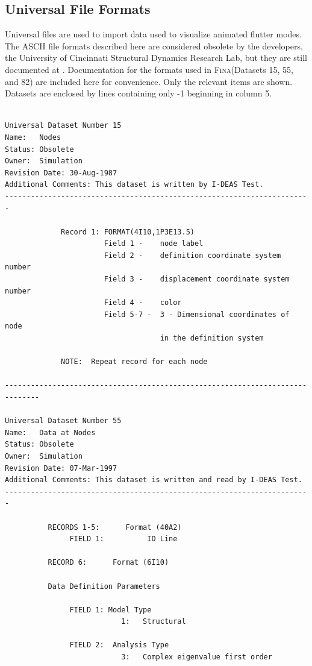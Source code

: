 \documentclass[10pt,openany,twoside]{book}
\numberwithin{equation}{section}   %
\newcommand{\Fina}{{\normalfont\scshape Fina\:}}
\begin{document}
\subsection{Universal File Formats}\label{sect:universal-file}
Universal files are used to import data used to visualize animated
flutter modes.
The ASCII file formats described here are considered obsolete by the
developers, the University of Cincinnati Structural Dynamics Research Lab,
but they are still documented at \cite{UniversalFile}. Documentation for
the formats used in \Fina (Datasets 15, 55, and 82) are included here
for convenience. Only the relevant items are shown. Datasets are enclosed
by lines containing only -1 beginning in column 5.
\par
\begin{verbatim}

Universal Dataset Number 15
Name:   Nodes
Status: Obsolete
Owner:  Simulation
Revision Date: 30-Aug-1987
Additional Comments: This dataset is written by I-DEAS Test.
-----------------------------------------------------------------------

             Record 1: FORMAT(4I10,1P3E13.5)
                       Field 1 -    node label
                       Field 2 -    definition coordinate system number
                       Field 3 -    displacement coordinate system number
                       Field 4 -    color
                       Field 5-7 -  3 - Dimensional coordinates of node
                                    in the definition system

             NOTE:  Repeat record for each node

------------------------------------------------------------------------------

Universal Dataset Number 55
Name:   Data at Nodes
Status: Obsolete
Owner:  Simulation
Revision Date: 07-Mar-1997
Additional Comments: This dataset is written and read by I-DEAS Test.
-----------------------------------------------------------------------

          RECORDS 1-5:      Format (40A2)
               FIELD 1:          ID Line

          RECORD 6:      Format (6I10)

          Data Definition Parameters

               FIELD 1: Model Type
                           1:   Structural

               FIELD 2:  Analysis Type
                           3:   Complex eigenvalue first order


\end{verbatim}
\end{document}
